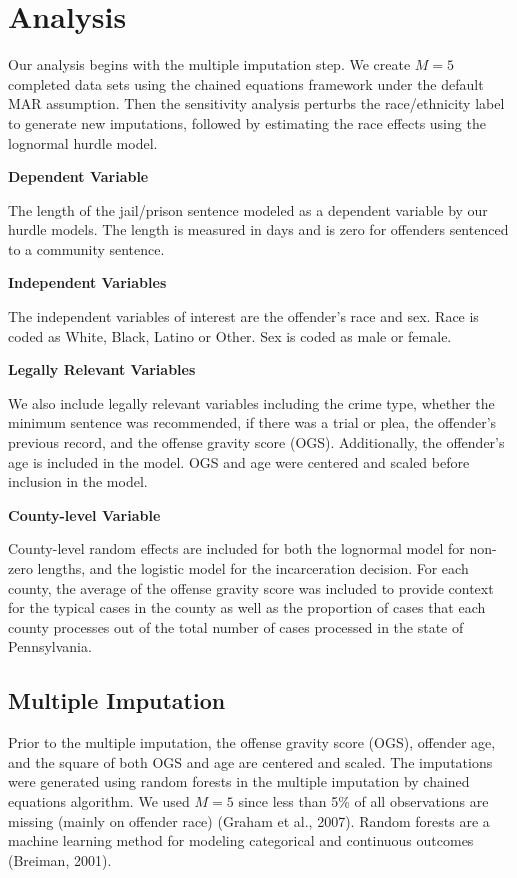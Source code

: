 \documentclass[
  letterpaper,
  DIV=11,
  numbers=noendperiod]{scrartcl}
\begin{document}
\hypertarget{analysis}{%
\section{Analysis}\label{analysis}}

Our analysis begins with the multiple imputation step. We create
\(M = 5\) completed data sets using the chained equations framework
under the default MAR assumption. Then the sensitivity analysis perturbs
the race/ethnicity label to generate new imputations, followed by
estimating the race effects using the lognormal hurdle model.

\textbf{Dependent Variable}

The length of the jail/prison sentence modeled as a dependent variable
by our hurdle models. The length is measured in days and is zero for
offenders sentenced to a community sentence.

\textbf{Independent Variables}

The independent variables of interest are the offender's race and sex.
Race is coded as White, Black, Latino or Other. Sex is coded as male or
female.

\textbf{Legally Relevant Variables}

We also include legally relevant variables including the crime type,
whether the minimum sentence was recommended, if there was a trial or
plea, the offender's previous record, and the offense gravity score
(OGS). Additionally, the offender's age is included in the model. OGS
and age were centered and scaled before inclusion in the model.

\textbf{County-level Variable}

County-level random effects are included for both the lognormal model
for non-zero lengths, and the logistic model for the incarceration
decision. For each county, the average of the offense gravity score was
included to provide context for the typical cases in the county as well
as the proportion of cases that each county processes out of the total
number of cases processed in the state of Pennsylvania.

\hypertarget{multiple-imputation}{%
\subsection{Multiple Imputation}\label{multiple-imputation}}

Prior to the multiple imputation, the offense gravity score (OGS),
offender age, and the square of both OGS and age are centered and
scaled. The imputations were generated using random forests in the
multiple imputation by chained equations algorithm. We used \(M = 5\)
since less than 5\% of all observations are missing (mainly on offender
race) (Graham et al., 2007). Random forests are a machine learning
method for modeling categorical and continuous outcomes (Breiman, 2001).
\end{document}
